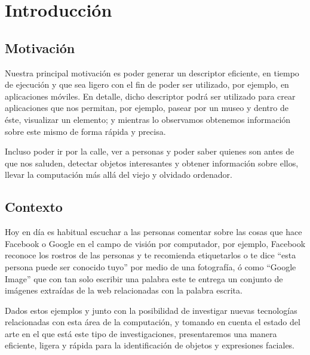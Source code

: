 \chapter[Introducción]{Introducción}\label{ch:capitulo1}



\section{Motivación}\label{chsub:Motivación}

Nuestra principal motivación es poder generar un descriptor eficiente, en tiempo de ejecución y que sea ligero con el fin de poder ser utilizado, por ejemplo, en aplicaciones móviles. En detalle, dicho descriptor podrá ser utilizado para crear aplicaciones que nos permitan, por ejemplo, pasear por un museo y dentro de éste, visualizar un elemento; y mientras lo observamos obtenemos información sobre este mismo de forma rápida y precisa.


Incluso poder ir por la calle, ver a personas  y poder saber quienes son antes de que nos saluden, detectar objetos interesantes y obtener información sobre ellos, llevar la computación más allá del viejo y olvidado ordenador.

\section{Contexto}\label{chsub:Contexto}

Hoy en día es habitual escuchar a las personas comentar sobre las cosas que hace Facebook o Google en el campo de visión por computador, por ejemplo, Facebook reconoce los rostros de las personas y te recomienda etiquetarlos o te dice ``esta persona puede ser conocido tuyo'' por medio de una fotografía, ó como ``Google Image'' que con tan solo escribir una palabra este te entrega un conjunto de imágenes extraídas de la web relacionadas con la palabra escrita.

Dados estos ejemplos y junto con la posibilidad de investigar nuevas tecnologías relacionadas con esta área de la computación, y tomando en cuenta el estado del arte en el que está este tipo de investigaciones, presentaremos una manera eficiente, ligera y rápida para la identificación de objetos y expresiones faciales.

